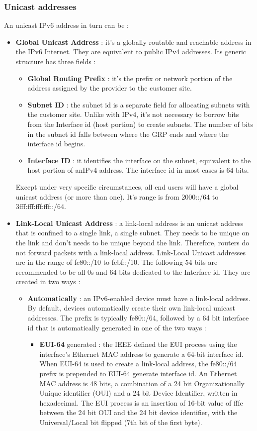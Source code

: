 \documentclass[11pt]{article}
\begin{document}
\subsubsection{Unicast addresses}
An unicast IPv6 address in turn can be :
\begin{itemize}
\item \textbf{Global Unicast Address} : it's a globally routable and reachable address in the IPv6 Internet. They are equivalent to public IPv4 addresses. Its generic structure has three fields :
\begin{itemize}
\item \textbf{Global Routing Prefix} : it's the prefix or network portion of the address assigned by the provider to the customer site.
\item \textbf{Subnet ID} : the subnet id is a separate field for allocating subnets with the customer site. Unlike with IPv4, it's not necessary to borrow bits from the Interface id (host portion) to create subnets. The number of bits in the subnet id falls between where the GRP ends and where the interface id begins.
\item \textbf{Interface ID} : it identifies the interface on the subnet, equivalent to the host portion of anIPv4 address. The interface id in most cases is 64 bits.
\end{itemize}
 Except under very specific circumstances, all end users will have a global unicast address (or more than one). It's range is from 2000::/64 to 3fff:fff:fff:fff::/64.
\item \textbf{Link-Local Unicast Address} : a link-local address is an unicast address that is confined to a single link, a single subnet. They needs to be unique on the link and don't needs to be unique beyond the link. Therefore, routers do not forward packets with a link-local address. Link-Local Unicast  addresses are in the range of fe80::/10 to febf::/10. The following 54 bits are recommended to be all 0s and 64 bits dedicated to the Interface id. They are created in two ways :
\begin{itemize}
\item \textbf{Automatically} : an IPv6-enabled device must have a link-local address. By default, devices automatically create their own link-local unicast addresses. The prefix is typically fe80::/64, followed by a 64 bit interface id that is automatically generated in one of the two ways :
\begin{itemize}
\item \textbf{EUI-64} generated : the IEEE defined the EUI process using the interface's Ethernet MAC address to generate a 64-bit interface id. When EUI-64 is used to create a link-local address, the fe80::/64 prefix is prepended to EUI-64 generate interface id. An Ethernet MAC address is 48  bits, a combination of a 24 bit Organizationally Unique identifier (OUI) and a 24 bit Device Identifier, written in hexadecimal. The EUI process is an insertion of 16-bit value of fffe between the 24 bit OUI and the 24 bit device identifier, with the Universal/Local bit flipped (7th bit of the first byte).       

\end{itemize}
\end{itemize}
\end{itemize}
\end{document}
